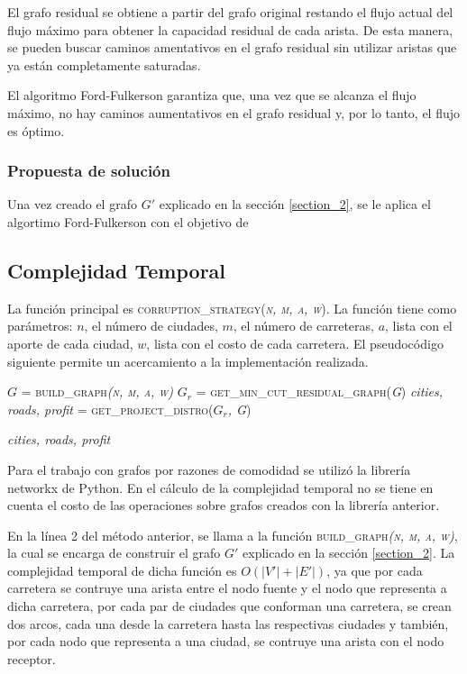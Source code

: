 \documentclass[10pt]{article} %
\begin{document}
	El grafo residual se obtiene a partir del grafo original restando el flujo actual del flujo máximo para obtener la capacidad residual de cada arista. De esta manera, se pueden buscar caminos amentativos en el grafo residual sin utilizar aristas que ya están completamente saturadas.
	
	El algoritmo Ford-Fulkerson garantiza que, una vez que se alcanza el flujo máximo, no hay caminos aumentativos en el grafo residual y, por lo tanto, el flujo es óptimo.
	
	\subsubsection{Propuesta de soluci\'on}
	
	Una vez creado el grafo $G'$ explicado en la secci\'on \ref{section_2}, se le aplica el algortimo Ford-Fulkerson con el objetivo de 
	
	
	\subsection{Complejidad Temporal}
	
	La funci\'on principal es \textsc{corruption\_strategy(\textit{n, m, a, w})}. La funci\'on tiene como par\'ametros: $n$, el n\'umero de ciudades, $m$, el n\'umero de carreteras, $a$, lista con el aporte de cada ciudad, $w$, lista con el costo de cada carretera. El pseudoc\'odigo siguiente permite un acercamiento a la implementaci\'on realizada.
	
	\begin{algorithmic}[1]
		
		\State $G$ = \textsc{build\_graph\textit{(n, m, a, w)}}
		\State $G_r$ =\textsc{ get\_min\_cut\_residual\_graph(\textit{G})}
		\State \textit{cities, roads, profit} = \textsc{get\_project\_distro(\textit{$G_r$, G})}
		
		\Return \textit{cities, roads, profit}
		\EndFunction
	\end{algorithmic}

	Para el trabajo con grafos por razones de comodidad se utilizó la librería networkx de Python.	En el cálculo de la complejidad temporal no se tiene en cuenta el costo de las operaciones sobre
	grafos creados con la librería anterior.
	
	En la l\'inea 2 del m\'etodo anterior, se llama a la funci\'on \textsc{build\_graph\textit{(n, m, a, w)}}, la cual se encarga de construir el grafo $G'$ explicado en la secci\'on \ref{section_2}. La complejidad temporal de dicha funci\'on es $O(|V'| + |E'|)$, ya que por cada carretera se contruye una arista entre el nodo fuente y el nodo que representa a dicha carretera,  por cada par de ciudades que conforman una carretera, se crean dos arcos, cada una desde la carretera hasta las respectivas ciudades y tambi\'en, por cada nodo que representa a una ciudad, se contruye una arista con el nodo receptor.
	
\end{document}

